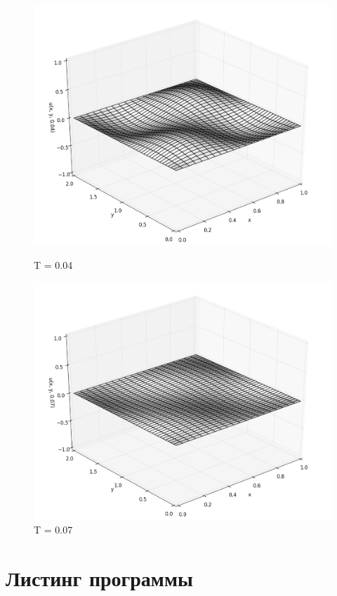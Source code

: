 \documentclass[12pt]{article}
\begin{document}
\begin{figure}[h!]
\begin{minipage}[h]{0.5\linewidth}
				\includegraphics[width=\linewidth]{solution_t04}
				\caption{T = 0.04}
			\end{minipage}
			\hfill
			\begin{minipage}[h]{0.5\linewidth}
				\includegraphics[width=\linewidth]{solution_t07}
				\caption{T = 0.07}
			\end{minipage}
		\end{figure}
	\newpage
	\section{Листинг программы}
	
	
\end{document}
